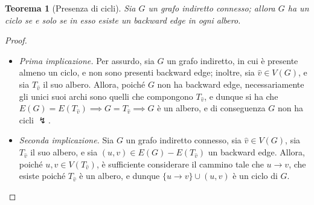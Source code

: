 \documentclass[14pt]{extreport}
\newtheorem{theorem}{Teorema}[subsection]
\theoremstyle{definition}
\theoremstyle{definition}
\begin{document}
\begin{theorem}[Presenza di cicli]
    Sia $G$ un grafo indiretto connesso; allora $G$ ha un ciclo se e solo se in esso esiste un backward edge in ogni albero.
\end{theorem}

\begin{proof}
    \hspace{0.7cm}
    \begin{itemize}
        \item[] \textit{Prima implicazione.} Per assurdo, sia $G$ un grafo indiretto, in cui è presente almeno un ciclo, e non sono presenti backward edge; inoltre, sia $\hat v \in V(G)$, e sia $T_{\hat v}$ il suo albero. Allora, poiché $G$ non ha backward edge, necessariamente gli unici suoi archi sono quelli che compongono $T_{\hat v}$, e dunque si ha che $E(G) = E(T_{\hat v}) \implies G = T_{\hat v} \implies G$ è un albero, e di conseguenza $G$ non ha cicli $\lightning$.
        \item[] \textit{Seconda implicazione.} Sia $G$ un grafo indiretto connesso, sia $\hat v \in V(G)$, sia $T_{\hat v}$ il suo albero, e sia $(u, v) \in E(G) - E(T_{\hat v})$ un backward edge. Allora, poiché $u, v \in V(T_{\hat v})$, è sufficiente considerare il cammino tale che $u \rightarrow v$, che esiste poiché $T_{\hat v}$ è un albero, e dunque $\{u \rightarrow v\} \cup (u, v)$ è un ciclo di $G$.
    \end{itemize}
\end{proof}
\end{document}
